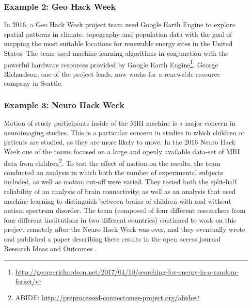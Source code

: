 \subsubsection*{Example 2: Geo Hack Week}
In 2016, a Geo Hack Week project team used Google Earth Engine to explore spatial patterns in climate, topography and population data with the goal of mapping the most suitable locations for renewable energy sites in the United States.
The team used machine learning algorithms in conjunction with the powerful hardware resources provided by Google Earth Engine\footnote{\url{http://georgerichardson.net/2017/04/10/searching-for-energy-in-a-random-forest/}}.
George Richardson, one of the project leads, now works for a renewable resource company in Seattle.
\subsubsection*{Example 3: Neuro Hack Week}
Motion of study participants inside of the MRI machine is a major concern in neuroimaging studies.
This is a particular concern in studies in which children or patients are studied, as they are more likely to move.
In the 2016 Neuro Hack Week one of the teams focused on a large and openly available data-set of MRI data from children\footnote{ABIDE: \url{http://preprocessed-connectomes-project.org/abide}}.
To test the effect of motion on the results, the team conducted an analysis in which both the number of experimental subjects included, as well as motion cut-off were varied.
They tested both the split-half reliability of an analysis of brain connectivity, as well as an analysis that used machine learning to distinguish between brains of children with and without autism spectrum disorder.
The team (composed of four different researchers from four different institutions in two different countries) continued to work on this project remotely after the Neuro Hack Week was over, and they eventually wrote and published a paper describing these results in the open access journal Research Ideas and Outcomes \cite{leonard2017}.
